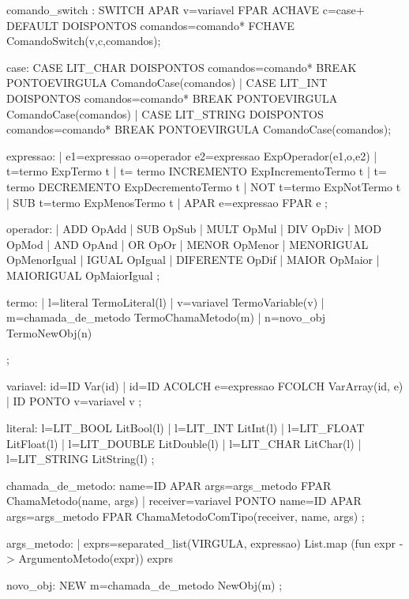\documentclass[12pt,a4paper,twoside]{report}
\begin{document}
\begin{terminal}
comando_switch : SWITCH APAR v=variavel FPAR ACHAVE c=case+ DEFAULT DOISPONTOS comandos=comando* FCHAVE {ComandoSwitch(v,c,comandos)};

case:
CASE LIT_CHAR DOISPONTOS comandos=comando* BREAK PONTOEVIRGULA { ComandoCase(comandos)}
| CASE LIT_INT DOISPONTOS comandos=comando* BREAK PONTOEVIRGULA {ComandoCase(comandos)}
| CASE LIT_STRING DOISPONTOS comandos=comando* BREAK PONTOEVIRGULA {ComandoCase(comandos)};


expressao:
   | e1=expressao o=operador e2=expressao { ExpOperador(e1,o,e2) }
   | t=termo {ExpTermo t} 
   | t= termo INCREMENTO {ExpIncrementoTermo t}
   | t= termo DECREMENTO {ExpDecrementoTermo t}
   | NOT t=termo { ExpNotTermo t }
   | SUB t=termo { ExpMenosTermo t } 
   | APAR e=expressao FPAR { e }
   ;

operador:
    | ADD { OpAdd }
    | SUB { OpSub }
    | MULT { OpMul }
    | DIV { OpDiv }
    | MOD { OpMod }
    | AND { OpAnd }
    | OR { OpOr }
    | MENOR { OpMenor }
    | MENORIGUAL { OpMenorIgual }
    | IGUAL { OpIgual }
    | DIFERENTE { OpDif }
    | MAIOR { OpMaior }
    | MAIORIGUAL { OpMaiorIgual }
    ;



termo:
    | l=literal { TermoLiteral(l) }
    | v=variavel { TermoVariable(v) }
    | m=chamada_de_metodo { TermoChamaMetodo(m) }
    | n=novo_obj { TermoNewObj(n) }

    ;

variavel:
      id=ID { Var(id) }
    | id=ID ACOLCH e=expressao FCOLCH { VarArray(id, e) }
    | ID PONTO v=variavel { v }
    ;

literal:
    l=LIT_BOOL { LitBool(l) }
    | l=LIT_INT { LitInt(l) }
    | l=LIT_FLOAT { LitFloat(l) }
    | l=LIT_DOUBLE { LitDouble(l) }
    | l=LIT_CHAR { LitChar(l) }
    | l=LIT_STRING { LitString(l) }
    ;



chamada_de_metodo:
      name=ID APAR args=args_metodo FPAR { ChamaMetodo(name, args) }
      | receiver=variavel PONTO name=ID APAR args=args_metodo FPAR { ChamaMetodoComTipo(receiver, name, args) }
    ;

args_metodo:
    | exprs=separated_list(VIRGULA, expressao) {  List.map (fun expr -> ArgumentoMetodo(expr)) exprs }

novo_obj:
    NEW m=chamada_de_metodo { NewObj(m) }
    ;

\end{terminal}
\end{document}
